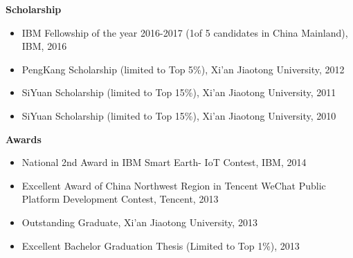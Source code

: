 \documentclass[letterpaper,11pt]{article}
\makeatletter
\newcommand{\resitem}[1]{\item #1 \vspace{-2pt}}
\newcommand{\resheading}[1]{{\large \colorbox{mygrey}{\begin{minipage}{\textwidth}{\textbf{#1 \vphantom{p\^{E}}}}\end{minipage}}}}
\newcommand{\ressubheading}[4]{
\begin{tabular*}{6.5in}{l@{\extracolsep{\fill}}r}
		\textbf{#1} & #2 \\
		\textit{#3} & \textit{#4} \\
\end{tabular*}\vspace{-6pt}}
\makeatother
\begin{document}

\resheading{Scholarship}
	\begin{itemize}
		\item
			IBM Fellowship of the year 2016-2017 (1of 5 candidates in China Mainland), IBM, 2016
		\item
			PengKang Scholarship (limited to Top 5\%), Xi'an Jiaotong University, 2012
		\item
			SiYuan Scholarship (limited to Top 15\%), Xi'an Jiaotong University, 2011
		\item
			SiYuan Scholarship (limited to Top 15\%), Xi'an Jiaotong University, 2010
	\end{itemize}

\resheading{Awards}
	\begin{itemize}
		\item
			National 2nd Award in IBM Smart Earth- IoT Contest, IBM, 2014
		\item
			Excellent Award of China Northwest Region in Tencent WeChat Public Platform Development Contest, Tencent, 2013
		\item
			Outstanding Graduate, Xi'an Jiaotong University, 2013
		\item
			Excellent Bachelor Graduation Thesis (Limited to Top 1\%), 2013
	\end{itemize}
	
\end{document}
